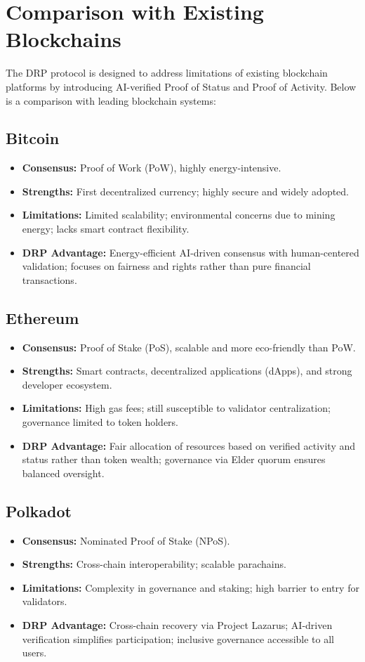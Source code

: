 \documentclass[11pt,a4paper]{article}
\begin{document}
\section{Comparison with Existing Blockchains}

The DRP protocol is designed to address limitations of existing blockchain platforms by introducing AI-verified Proof of Status and Proof of Activity. Below is a comparison with leading blockchain systems:

\subsection{Bitcoin}
\begin{itemize}
    \item \textbf{Consensus:} Proof of Work (PoW), highly energy-intensive.
    \item \textbf{Strengths:} First decentralized currency; highly secure and widely adopted.
    \item \textbf{Limitations:} Limited scalability; environmental concerns due to mining energy; lacks smart contract flexibility.
    \item \textbf{DRP Advantage:} Energy-efficient AI-driven consensus with human-centered validation; focuses on fairness and rights rather than pure financial transactions.
\end{itemize}

\subsection{Ethereum}
\begin{itemize}
    \item \textbf{Consensus:} Proof of Stake (PoS), scalable and more eco-friendly than PoW.
    \item \textbf{Strengths:} Smart contracts, decentralized applications (dApps), and strong developer ecosystem.
    \item \textbf{Limitations:} High gas fees; still susceptible to validator centralization; governance limited to token holders.
    \item \textbf{DRP Advantage:} Fair allocation of resources based on verified activity and status rather than token wealth; governance via Elder quorum ensures balanced oversight.
\end{itemize}

\subsection{Polkadot}
\begin{itemize}
    \item \textbf{Consensus:} Nominated Proof of Stake (NPoS).
    \item \textbf{Strengths:} Cross-chain interoperability; scalable parachains.
    \item \textbf{Limitations:} Complexity in governance and staking; high barrier to entry for validators.
    \item \textbf{DRP Advantage:} Cross-chain recovery via Project Lazarus; AI-driven verification simplifies participation; inclusive governance accessible to all users.
\end{itemize}
\end{document}
